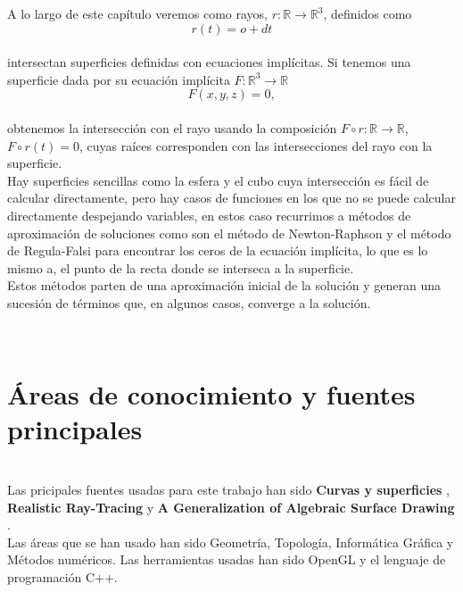A lo largo de este capítulo veremos como rayos, $ r : \mathbb{R} \to \mathbb{R}^3$, definidos como
${ }$\\
$$ r(t) = o + dt $$
${ }$\\
intersectan superficies definidas con ecuaciones implícitas. Si tenemos una superficie dada por su ecuación implícita $ F : \mathbb{R}^3 \to \mathbb{R} $
${ }$\\
$$ F(x,y,z) = 0, $$
${ }$\\
obtenemos la intersección con el rayo usando la composición $F \circ r : \mathbb{R} \to \mathbb{R}$, $F \circ r (t) = 0$, cuyas raíces corresponden con las intersecciones del rayo con la superficie.
${ }$\\

Hay superficies sencillas como la esfera y el cubo cuya intersección es fácil de calcular directamente, pero hay casos de funciones en los que no se puede calcular directamente despejando variables, en estos caso recurrimos a métodos de aproximación de soluciones como son el método de Newton-Raphson y el método de Regula-Falsi para encontrar los ceros de la ecuación implícita, lo que es lo mismo a, el punto de la recta donde se interseca a la superficie.
${ }$\\

Estos métodos parten de una aproximación inicial de la solución y generan una sucesión de términos que, en algunos casos, converge a la solución.

${ }$\\
\section{Áreas de conocimiento y fuentes principales}
${ }$\\

Las pricipales fuentes usadas para este trabajo han sido \textbf{Curvas y superficies} \cite{MonRos}, \textbf{Realistic Ray-Tracing} \cite{Shirley} y \textbf{A Generalization of Algebraic Surface Drawing} \cite{Blinn}.
${ }$\\

Las áreas que se han usado han sido Geometría, Topología, Informática Gráfica y Métodos numéricos. Las herramientas usadas han sido OpenGL y el lenguaje de programación C++.
${ }$\\